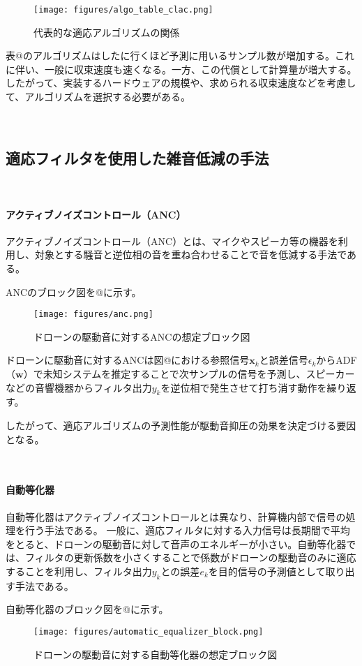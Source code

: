 \begin{figure}
\centering
\texttt{[image: figures/algo\_table\_clac.png]}
\caption{代表的な適応アルゴリズムの関係}
\end{figure}

表@のアルゴリズムはしたに行くほど予測に用いるサンプル数が増加する。これに伴い、一般に収束速度も速くなる。一方、この代償として計算量が増大する。したがって、実装するハードウェアの規模や、求められる収束速度などを考慮して、アルゴリズムを選択する必要がある。

\
\subsection{適応フィルタを使用した雑音低減の手法}\label{ux9069ux5fdcux30d5ux30a3ux30ebux30bfux3092ux4f7fux7528ux3057ux305fux96d1ux97f3ux4f4eux6e1bux306eux624bux6cd5}

\
\paragraph{アクティブノイズコントロール（ANC）}\label{ux30a2ux30afux30c6ux30a3ux30d6ux30ceux30a4ux30baux30b3ux30f3ux30c8ux30edux30fcux30ebanc}

アクティブノイズコントロール（ANC）とは、マイクやスピーカ等の機器を利用し、対象とする騒音と逆位相の音を重ね合わせることで音を低減する手法である。

ANCのブロック図を@に示す。

\begin{figure}
\centering
\texttt{[image: figures/anc.png]}
\caption{ドローンの駆動音に対するANCの想定ブロック図}
\end{figure}

ドローンに駆動音に対するANCは図@における参照信号\(\bm{x}_k\)と誤差信号\(\epsilon_k\)からADF（\(\bm{w}\)）で未知システムを推定することで次サンプルの信号を予測し、スピーカーなどの音響機器からフィルタ出力\(y_k\)を逆位相で発生させて打ち消す動作を繰り返す。

したがって、適応アルゴリズムの予測性能が駆動音抑圧の効果を決定づける要因となる。

\
\paragraph{自動等化器}\label{ux81eaux52d5ux7b49ux5316ux5668}

自動等化器はアクティブノイズコントロールとは異なり、計算機内部で信号の処理を行う手法である。
一般に、適応フィルタに対する入力信号は長期間で平均をとると、ドローンの駆動音に対して音声のエネルギーが小さい。自動等化器では、フィルタの更新係数を小さくすることで係数がドローンの駆動音のみに適応することを利用し、フィルタ出力\(y_k\)との誤差\(e_k\)を目的信号の予測値として取り出す手法である。

自動等化器のブロック図を@に示す。

\begin{figure}
\centering
\texttt{[image: figures/automatic\_equalizer\_block.png]}
\caption{ドローンの駆動音に対する自動等化器の想定ブロック図}
\end{figure}
